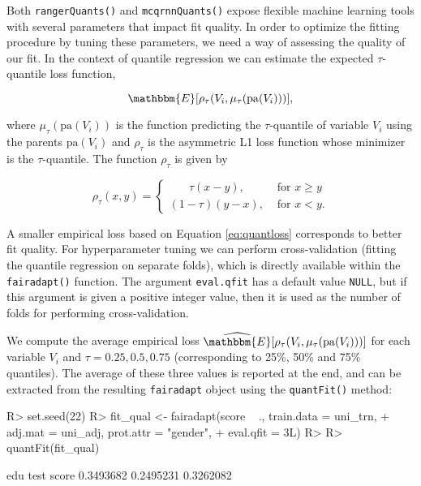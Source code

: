 \documentclass[
  nojss]{jss}
\begin{document}
Both \texttt{rangerQuants()} and \texttt{mcqrnnQuants()} expose flexible
machine learning tools with several parameters that impact fit quality.
In order to optimize the fitting procedure by tuning these parameters,
we need a way of assessing the quality of our fit. In the context of
quantile regression we can estimate the expected \(\tau\)-quantile loss
function,

\begin{equation}
\label{eq:quantloss}
\mathbbm{E}[\rho_{\tau}(V_i, \mu_{\tau}(\mathrm{pa}(V_i)))],
\end{equation}

where \(\mu_{\tau}(\mathrm{pa}(V_i))\) is the function predicting the
\(\tau\)-quantile of variable \(V_i\) using the parents
\(\mathrm{pa}(V_i)\) and \(\rho_{\tau}\) is the asymmetric L1 loss
function whose minimizer is the \(\tau\)-quantile. The function
\(\rho_{\tau}\) is given by

\[
\rho_{\tau}(x, y) = \begin{cases}
                      \phantom{( )}\tau(x-y), & \text{ for } x \geq y\\
                      (1-\tau)(y-x), & \text{ for } x < y.
                    \end{cases}
\]

A smaller empirical loss based on Equation \ref{eq:quantloss}
corresponds to better fit quality. For hyperparameter tuning we can
perform cross-validation (fitting the quantile regression on separate
folds), which is directly available within the \texttt{fairadapt()}
function. The argument \texttt{eval.qfit} has a default value
\texttt{NULL}, but if this argument is given a positive integer value,
then it is used as the number of folds for performing cross-validation.

We compute the average empirical loss
\(\widehat{\mathbbm{E}} [\rho_{\tau} (V_i, \mu_{\tau}(\mathrm{pa}(V_i)))]\)
for each variable \(V_i\) and \(\tau = 0.25, 0.5, 0.75\) (corresponding
to 25\%, 50\% and 75\% quantiles). The average of these three values is
reported at the end, and can be extracted from the resulting
\texttt{fairadapt} object using the \texttt{quantFit()} method:

\begin{CodeChunk}
\begin{CodeInput}
R> set.seed(22)
R> fit_qual <- fairadapt(score ~ ., train.data = uni_trn,
+                       adj.mat = uni_adj, prot.attr = "gender",
+                       eval.qfit = 3L)
R> 
R> quantFit(fit_qual)
\end{CodeInput}
\begin{CodeOutput}
      edu      test     score 
0.3493682 0.2495231 0.3262082 
\end{CodeOutput}
\end{CodeChunk}
\end{document}
